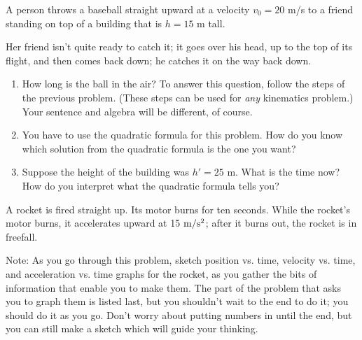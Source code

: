\documentclass[12pt]{article}
\begin{document}
\newpage

A person throws a baseball straight upward at a velocity $v_0 = 20$ m/s
to a friend standing on top of a building that is $h=15$ m tall. 
 
Her friend isn't quite ready to catch it; it goes over his head, up to the 
top of its flight, and then comes back down; he catches it on the way back down.

\begin{enumerate}
\item
How long is the ball in the air? To answer this question, follow the steps
of the previous problem. (These steps can be used for {\it any} kinematics
problem.) Your sentence and algebra will be different, of course.

\item
You have to use the quadratic formula for this problem. How do you know
which solution from the quadratic formula is the one you want?

\item 
Suppose the height of the building was $h'=25$ m. What is the time now?
How do you interpret what the quadratic formula tells you?
\end{enumerate}

\newpage

A rocket is fired straight up. Its motor burns for ten seconds. While the rocket's motor burns, it
accelerates upward at 15 $\rm m/\rm s^2$; 
after it burns out, the rocket is in freefall.

Note: As you go through this problem, sketch position vs. time, velocity vs. time, and acceleration
vs. time graphs for the rocket, as you gather the bits of information that enable you to make
them. The part of the problem that asks you to graph them is listed last, but you shouldn't wait to
the end to do it; you should do it as you go. Don't worry about putting numbers
in until the end, but you can still make a sketch which will guide your thinking.
\end{document}
